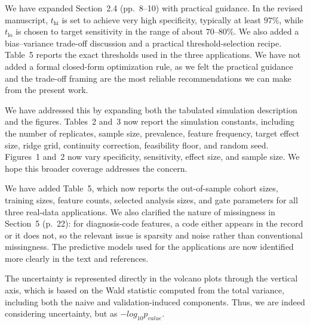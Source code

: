 \documentclass[onecolumn,11pt]{IEEEtran}
\begin{document}
We have expanded Section~2.4 (pp.~8--10) with practical guidance. In the revised manuscript, $t_{\mathrm{hi}}$ is set to achieve very high specificity, typically at least $97\%$, while $t_{\mathrm{lo}}$ is chosen to target sensitivity in the range of about $70$--$80\%$. We also added a bias--variance trade-off discussion and a practical threshold-selection recipe. Table~5 reports the exact thresholds used in the three applications. We have not added a formal closed-form optimization rule, as we felt the practical guidance and the trade-off framing are the most reliable recommendations we can make from the present work.

We have addressed this by expanding both the tabulated simulation description and the figures. Tables~2 and~3 now report the simulation constants, including the number of replicates, sample size, prevalence, feature frequency, target effect size, ridge grid, continuity correction, feasibility floor, and random seed. Figures~1 and~2 now vary specificity, sensitivity, effect size, and sample size. We hope this broader coverage addresses the concern.

We have added Table~5, which now reports the out-of-sample cohort sizes, training sizes, feature counts, selected analysis sizes, and gate parameters for all three real-data applications. We also clarified the nature of missingness in Section~5 (p.~22): for diagnosis-code features, a code either appears in the record or it does not, so the relevant issue is sparsity and noise rather than conventional missingness. The predictive models used for the applications are now identified more clearly in the text and references.

The uncertainty  is represented directly in the volcano plots through the vertical axis, which is based on the Wald statistic computed from the total variance, including both the naive and validation-induced components. Thus, we are indeed considering uncertainty, but as $-log_{10}p_{value}$.
\end{document}
